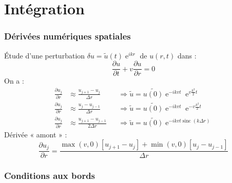 \documentclass[french]{beamer}
\DeclareMathOperator{\sinc}{sinc}
\DeclareMathOperator{\e}{e}
\begin{document}













\section{Intégration}

\begin{frame}
    \frametitle{Dérivées numériques spatiales}
    Étude d’une perturbation $\delta{u} = \tilde{u}(t) \e^{ikr}$ de $u(r,t)$ dans :
    \begin{equation*}
        \frac{\partial u}{\partial t} + v \frac{\partial u}{\partial r} = 0
    \end{equation*}
    On a :
    \begin{align*}
        \frac{\partial u_j}{\partial r} &\approx \frac{u_{j+1} - u_j    }{  \Delta{r}} &&\Rightarrow \tilde{u} = \tilde{u(0)} \e^{-i k v t} \e^{ v\frac{k^2}{2}t}\\
        \frac{\partial u_j}{\partial r} &\approx \frac{u_j     - u_{j-1}}{  \Delta{r}} &&\Rightarrow \tilde{u} = \tilde{u(0)} \e^{-i k v t} \e^{-v\frac{k^2}{2}t}\\
        \frac{\partial u_j}{\partial r} &\approx \frac{u_{j+1} - u_{j-1}}{2 \Delta{r}} &&\Rightarrow \tilde{u} = \tilde{u(0)} \e^{-i k v t \sinc(k \Delta{r})}
    \end{align*}
    Dérivée « amont » :
    \begin{equation*}
        \frac{\partial u_j}{\partial r} = \frac{\max(v,0) \left[u_{j+1} - u_j \right] + \min(v,0) \left[u_j - u_{j-1}\right]}{\Delta{r}}
    \end{equation*}
\end{frame}

\begin{frame}
    \frametitle{Conditions aux bords}
\end{frame}
\end{document}

